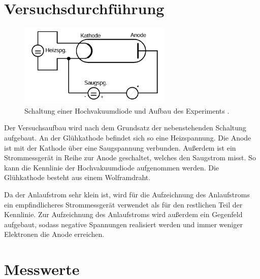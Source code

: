 %

%
\section{Versuchsdurchführung}

\begin{minipage}[t]{1\textwidth}
    \begin{figure}
        \vspace{-15pt}
        \begin{center}
            \includegraphics[width=0.65\textwidth]{content/Schaltung.png}
            \caption{Schaltung einer Hochvakuumdiode und Aufbau des Experiments \cite{Versuchsanleitung_v504}.}
        \end{center}
    \end{figure}
    Der Versuchsaufbau wird nach dem Grundsatz der nebenstehenden Schaltung aufgebaut. An der Glühkathode 
    befindet sich so eine Heizspannung. Die Anode ist mit der Kathode über eine Saugspannung verbunden. 
    Außerdem ist ein Strommessgerät in Reihe zur Anode geschaltet, welches den Saugstrom misst. So kann 
    die Kennlinie der Hochvakuumdiode aufgenommen werden. Die Glühkathode besteht aus einem Wolframdraht. \\
\end{minipage}
\noindent Da der Anlaufstrom sehr klein ist, wird für die Aufzeichnung des Anlaufstroms ein empfindlicheres 
Strommessgerät verwendet als für den restlichen Teil der Kennlinie.
Zur Aufzeichnung des Anlaufstroms wird außerdem ein Gegenfeld aufgebaut, sodass negative Spannungen 
realisiert werden und immer weniger Elektronen die Anode erreichen. 


\section{Messwerte}
\label{sec:Messwerte}

